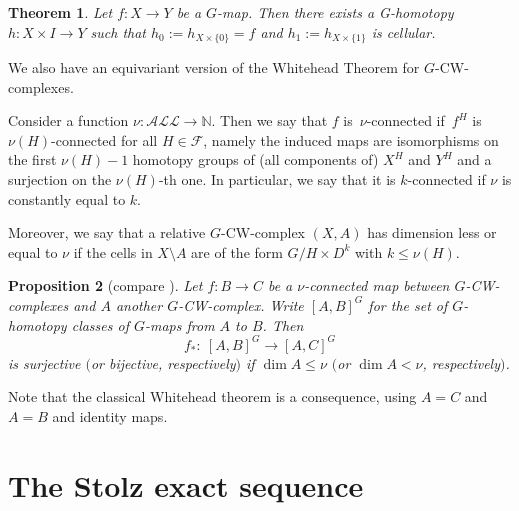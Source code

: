 \documentclass[11pt]{article}
\numberwithin{equation}{section}
\numberwithin{equation}{section}
\newtheorem{Theorem}{Theorem}[section]
\newtheorem{Proposition}[Theorem]{Proposition}
{ \theoremstyle{definition}
	\newtheorem{Definition}[Theorem]{Definition}
	\newtheorem{Note}[Theorem]{Note}
	\newtheorem{Example}[Theorem]{Example}
	\newtheorem{Remark}[Theorem]{Remark} }
\begin{document}
\begin{Theorem} \label{cellular}
	Let $f\colon X\to Y$ be a $G$-map. Then there exists a G-homotopy $h\colon X\times I\to Y$ such that $h_0:= h_{X\times\{0\}}=f$ and $h_1:= h_{X\times\{1\}}$ is cellular.
\end{Theorem}

We also have an equivariant version of the Whitehead Theorem for $G$-CW-complexes.

\begin{Definition}\label{def:connectedness}
	Consider a function $\nu\colon \mathcal{ALL}\to\mathbb{N}$. Then we say that
	$f$ is~$\nu$-connected if~$f^H$ is~$\nu(H)$-connected for all $H\in
	\mathcal{F}$, namely the induced maps are isomorphisms on the first
	$\nu(H)-1$ homotopy groups of (all components of) $X^H$ and $Y^H$ and a
	surjection on the $\nu(H)$-th one.
	In particular, we say that it is {$k$-connected} if $\nu$ is constantly equal to $k$.
	
	Moreover, we say that a relative $G$-CW-complex $(X,A)$ has dimension less or equal to $\nu$ if the cells in $X\setminus A$ are of the form $G/H\times D^k$ with $k\leq\nu(H)$.
\end{Definition}
\begin{Proposition}[{compare \cite[Proposition~2.6]{ttd}}] \label{whitehead}
	Let $f\colon B\to C$ be a $\nu$-connected map between $G$-CW-complexes and $A$
	another
	$G$-CW-complex. Write $[A,B]^G$ for the set of $G$-homotopy classes of
	$G$-maps from $A$ to $B$. Then
	\begin{equation*}
		f_*\colon\ [A,B]^G\to [A,C]^G
	\end{equation*}
	is surjective $($or
	bijective, respectively$)$ if $\dim A\leq\nu$ $($or $\dim A<\nu$, respectively$)$.
\end{Proposition}

Note that the classical Whitehead theorem is a consequence, using $A=C$
and $A=B$ and identity maps.

\section{The Stolz exact sequence}
	
\end{document}
